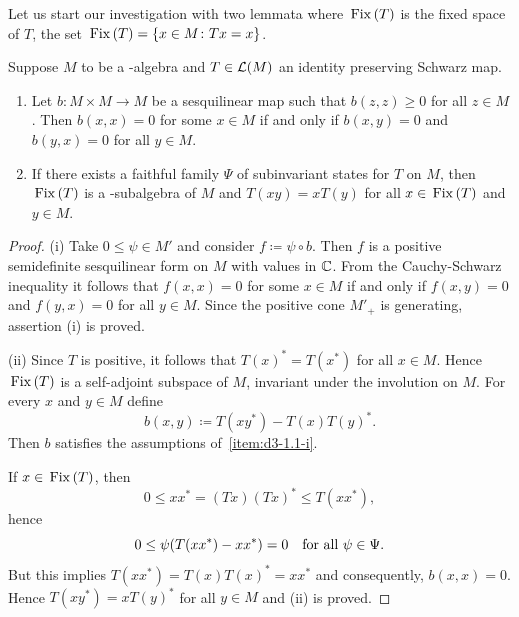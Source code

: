Let us start our investigation with two lemmata where $ \mathop{}\mathrm{Fix}\left(T\right) $ is the fixed space of\/ $T$, \ie the set $ \mathop{}\mathrm{Fix}\left(T\right) = \{x\in M \colon Tx=x \}$.
\begin{lemma}\label{lem:d3-1.1}
Suppose $M$ to be a \CA-algebra and $ T \in \mathcal{L}(M) $ an identity preserving Schwarz map.
\begin{enumerate}[\upshape (i)]%

\item\label{item:d3-1.1-i}
Let $ b \colon M \times M \to M $ be a sesquilinear map such that $ b(z,z) \geq 0 $ for all $ z \in M $.
Then $ b(x,x) = 0 $ for some $x\in M$ if and only if\/ $b(x,y) = 0$ and $b(y,x) = 0$ for all $y\in M$.

\item\label{item:d3-1.1-ii}
If there exists a faithful family $\Psi$ of subinvariant states for $T$ on $M$, then $\mathop{}\mathrm{Fix}\left(T\right)$ is a \CA-subalgebra of\/ $M$ and $T(xy) = xT(y)$ for all $ x \in \mathop{}\mathrm{Fix}\left(T\right) $ and $ y \in M $.

\end{enumerate}
\end{lemma}
\begin{proof} 
(i) Take $0 \leq \psi \in M'$ and consider $f \coloneq \psi\circ b$.
Then $f$ is a positive semidefinite sesquilinear form on $M$ with values in $\mathbb{C}$.
From the Cauchy-Schwarz inequality it follows that $f(x,x) = 0$ for some $x\in M$ if and only if\/ $f(x,y) = 0$ and $f(y,x) = 0$ for all $y\in M$.
Since the positive cone $M'_{+}$ is generating, assertion (i) is proved.

(ii) Since $T$ is positive,  it follows that $T(x)^{*} = T(x^{*})$ for all $x \in M$.
Hence $\mathop{}\mathrm{Fix}\left(T\right)$ is a self-adjoint subspace of\/ $M$, \ie invariant under the involution on $M$.
For every $x$ and $ y \in M $ define
\[
	b(x,y) \coloneq T(xy^{*}) - T(x)T(y)^{*}.
\]
Then $b$ satisfies the assumptions of~\ref{item:d3-1.1-i}.

If\/ $x\in\mathop{}\mathrm{Fix}\left(T\right)$, then
\[
0 \leq xx^{*} = (Tx)(Tx)^{*} \leq T(xx^{*}),
\]
hence
\[
0 \leq \psi(T(xx^{*}) - xx^{*}) = 0 \quad \text{for all $ \psi\in\Psi $.} 
\]
But this implies $T(xx^{*}) = T(x)T(x)^{*} = xx^{*}$ and consequently, $b(x,x) = 0$.
Hence $T(xy^{*}) = xT(y)^{*}$ for all $y\in M$ and (ii) is proved.
\end{proof}
